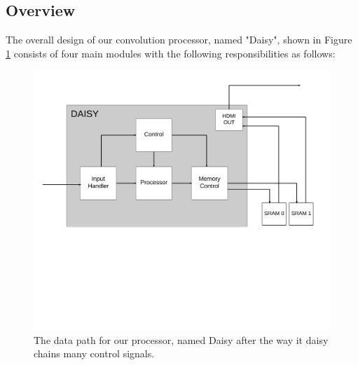 \subsection{Overview}
The overall design of our convolution processor, named "Daisy", shown in Figure \ref{fig:Convolution} consists of four main modules with the following responsibilities as follows:
\begin{figure}[h!]
    \includegraphics[width=\linewidth]{img/daisy_overview.png}
    \caption{The data path for our processor, named Daisy after the way it daisy chains many control signals.}
    \label{fig:Convolution}
\end{figure}

